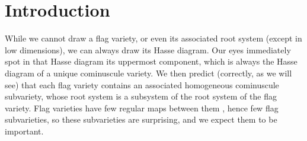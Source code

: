 \documentclass[a4paper,10pt]{amsart}
\theoremstyle{remark}
\begin{document}
\section{Introduction}
While we cannot draw a flag variety, or even its associated root system (except in low dimensions), we can always draw its Hasse diagram.
Our eyes immediately spot in that Hasse diagram its uppermost component, which is always the Hasse diagram of a unique cominuscule variety.
We then predict (correctly, as we will see) that each flag variety contains an associated homogeneous cominuscule subvariety, whose root system is a subsystem of the root system of the flag variety.
Flag varieties have few regular maps between them \cite{bakshi2023morphisms,kumar2023nonexistence,naldi2022morphisms,occhetta2023morphisms,Sierra:2021,Tango:1974,Tango:1976}, hence few flag subvarieties, so these subvarieties are surprising, and we expect them to be important.
\end{document}

